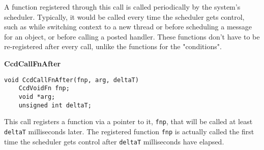 A function registered through this call is called periodically by the
system's scheduler.  Typically, it would be called every time the
scheduler gets control, such as while switching context to a new
thread or before scheduling a message for an object, or before calling
a posted handler. These functions don't have to be re-registered after
every call, unlike the functions for the "conditions". 

\vspace*{0.2in}
{\bf  CcdCallFnAfter}
\begin{verbatim}
void CcdCallFnAfter(fnp, arg, deltaT)
    CcdVoidFn fnp;
    void *arg;
    unsigned int deltaT; 
\end{verbatim}

This call registers a function via a pointer to it, {\tt fnp},  that will be
called at least {\tt deltaT} milliseconds later. 
The registered function {\tt fnp} is actually called the first time the
scheduler gets control after {\tt deltaT} milliseconds have elapsed. 

